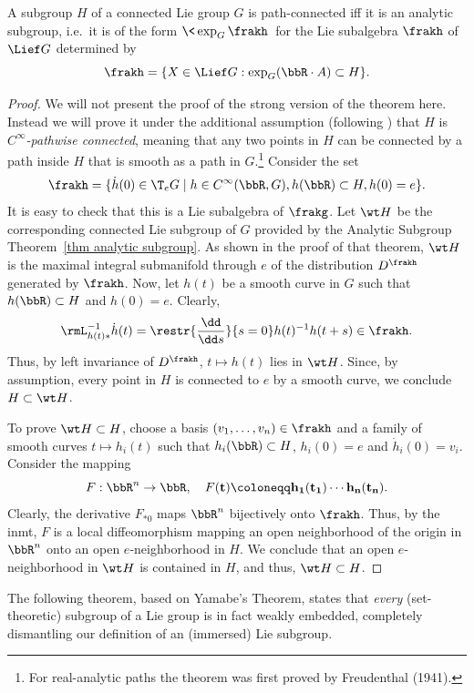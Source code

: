 \begin{thm}\label{thm Yamabe}
    A subgroup $H$ of a connected Lie group $G$ is path-connected iff it is an analytic subgroup, i.e.~it is of the form $\<\exp_G\frakh\>$ for the Lie subalgebra $\frakh$ of $\Lief G$ determined by
    \[\frakh=\{X\in\Lief G: \exp_G(\bbR\cdot A)\subset H\}.\]
\end{thm}
\begin{proof}
    We will not present the proof of the strong version of the theorem here. Instead we will prove it under the additional assumption (following \cite[Lem.~1.7.10]{RS2}) that $H$ is \emph{$C^\infty$-pathwise connected}, meaning that any two points in $H$ can be connected by a path inside $H$ that is smooth as a path in $G$.\footnote{For real-analytic paths the theorem was first proved by Freudenthal (1941).} Consider the set
    \[\frakh=\{\dot h(0)\in \T_eG\mid h\in C^\infty(\bbR,G),h(\bbR)\subset H,h(0)=e\}.\]
    It is easy to check that this is a Lie subalgebra of $\frakg$. Let $\wt H$ be the corresponding connected Lie subgroup of $G$ provided by the Analytic Subgroup Theorem~\ref{thm analytic subgroup}. As shown in the proof of that theorem, $\wt H$ is the maximal integral submanifold through $e$ of the distribution $D^\frakh$ generated by $\frakh$. Now, let $h(t)$ be a smooth curve in $G$ such that $h(\bbR)\subset H$ and $h(0)=e$. Clearly,
    \[\rmL_{h(t)\ast}^{-1}\dot h(t)=\restr{\frac{\dd}{\dd s}}{s=0}h(t)^{-1}h(t+s)\in\frakh.\]
    Thus, by left invariance of $D^\frakh$, $t\mapsto h(t)$ lies in $\wt H$. Since, by assumption, every point in $H$ is connected to $e$ by a smooth curve, we conclude $H\subset \wt H$.

    To prove $\wt H\subset H$, choose a basis $(v_1,\ldots,v_n)\in \frakh$ and a family of smooth curves $t\mapsto h_i(t)$ such that $h_i(\bbR)\subset H$, $h_i(0)=e$ and $\dot h_i(0)=v_i$. Consider the mapping
    \[F:\bbR^n\to \bbR,\quad F(\bf{t})\coloneqq h_1(t_1)\cdots h_n(t_n).\]
    Clearly, the derivative $F_{\ast 0}$ maps $\bbR^n$ bijectively onto $\frakh$. Thus, by the \gls{inmt}, $F$ is a local diffeomorphism mapping an open neighborhood of the origin in $\bbR^n$ onto an open $e$-neighborhood in $H$. We conclude that an open $e$-neighborhood in $\wt H$ is contained in $H$, and thus, $\wt H\subset H$.
\end{proof}

The following theorem, based on Yamabe's Theorem, states that \emph{every} (set-theoretic) subgroup of a Lie group is in fact weakly embedded, completely dismantling our definition of an (immersed) Lie subgroup.

